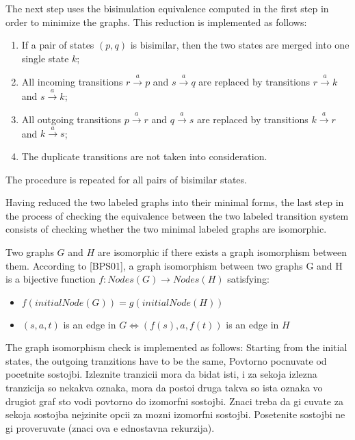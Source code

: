 

The next step uses the bisimulation equivalence computed in the first step in order to minimize the graphs. This reduction 
is implemented as follows:
\begin{enumerate}
	\item If a pair of states $(p, q)$ is bisimilar, then the two states are merged into one single state $k$;
	\item All incoming transitions $r \stackrel{a}{\rightarrow} p$ and $s \stackrel{a}{\rightarrow} q$ are replaced by transitions $r \stackrel{a}{\rightarrow} k$ and $s \stackrel{a}{\rightarrow} k$;
	\item All outgoing transitions $p \stackrel{a}{\rightarrow} r$ and $q \stackrel{a}{\rightarrow} s$ are replaced by transitions $k \stackrel{a}{\rightarrow} r$ and $k \stackrel{a}{\rightarrow} s$;
	\item The duplicate transitions are not taken into consideration.
\end{enumerate}
The procedure is repeated for all pairs of bisimilar states.

Having reduced the two labeled graphs into their minimal forms, the last step in the process of checking the equivalence
between the two labeled transition system consists of checking whether the two minimal labeled graphs are isomorphic.

Two graphs $G$ and $H$ are isomorphic if there exists a graph isomorphism between them. According to [BPS01], a graph isomorphism 
between two graphs G and H is a bijective function $f: Nodes(G) \rightarrow Nodes(H)$ satisfying:
\begin{itemize}
	\item $f(initialNode(G)) = g(initialNode(H))$
	\item $(s, a, t)$ is an edge in $G \Leftrightarrow (f(s), a, f(t))$ is an edge in $H$
\end{itemize}

The graph isomorphism check is implemented as follows:
Starting from the initial states, the outgoing tranzitions have to be the same, 
Povtorno pocnuvate od pocetnite sostojbi. Izleznite tranzicii mora da bidat isti, i za sekoja izlezna tranzicija so nekakva oznaka, mora da postoi druga takva so ista oznaka vo drugiot graf sto vodi povtorno do izomorfni sostojbi. Znaci treba da gi cuvate za sekoja sostojba nejzinite opcii za mozni izomorfni sostojbi. Posetenite sostojbi ne gi proveruvate (znaci ova e ednostavna rekurzija).


